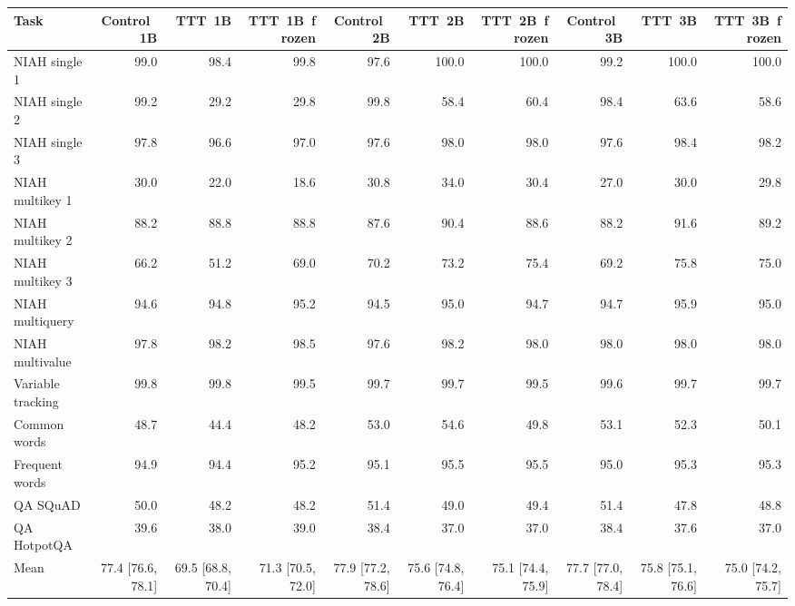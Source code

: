 \begin{tabular}{lrrrrrrrrr}
\toprule
Task & Control~1B & TTT~1B & TTT~1B~frozen & Control~2B & TTT~2B & TTT~2B~frozen & Control~3B & TTT~3B & TTT~3B~frozen \\
\midrule
NIAH single 1 & 99.0 & 98.4 & 99.8 & 97.6 & 100.0 & 100.0 & 99.2 & 100.0 & 100.0 \\
NIAH single 2 & 99.2 & 29.2 & 29.8 & 99.8 & 58.4 & 60.4 & 98.4 & 63.6 & 58.6 \\
NIAH single 3 & 97.8 & 96.6 & 97.0 & 97.6 & 98.0 & 98.0 & 97.6 & 98.4 & 98.2 \\
NIAH multikey 1 & 30.0 & 22.0 & 18.6 & 30.8 & 34.0 & 30.4 & 27.0 & 30.0 & 29.8 \\
NIAH multikey 2 & 88.2 & 88.8 & 88.8 & 87.6 & 90.4 & 88.6 & 88.2 & 91.6 & 89.2 \\
NIAH multikey 3 & 66.2 & 51.2 & 69.0 & 70.2 & 73.2 & 75.4 & 69.2 & 75.8 & 75.0 \\
NIAH multiquery & 94.6 & 94.8 & 95.2 & 94.5 & 95.0 & 94.7 & 94.7 & 95.9 & 95.0 \\
NIAH multivalue & 97.8 & 98.2 & 98.5 & 97.6 & 98.2 & 98.0 & 98.0 & 98.0 & 98.0 \\
Variable tracking & 99.8 & 99.8 & 99.5 & 99.7 & 99.7 & 99.5 & 99.6 & 99.7 & 99.7 \\
Common words & 48.7 & 44.4 & 48.2 & 53.0 & 54.6 & 49.8 & 53.1 & 52.3 & 50.1 \\
Frequent words & 94.9 & 94.4 & 95.2 & 95.1 & 95.5 & 95.5 & 95.0 & 95.3 & 95.3 \\
QA SQuAD & 50.0 & 48.2 & 48.2 & 51.4 & 49.0 & 49.4 & 51.4 & 47.8 & 48.8 \\
QA HotpotQA & 39.6 & 38.0 & 39.0 & 38.4 & 37.0 & 37.0 & 38.4 & 37.6 & 37.0 \\
\midrule
Mean & 77.4 [76.6, 78.1] & 69.5 [68.8, 70.4] & 71.3 [70.5, 72.0] & 77.9 [77.2, 78.6] & 75.6 [74.8, 76.4] & 75.1 [74.4, 75.9] & 77.7 [77.0, 78.4] & 75.8 [75.1, 76.6] & 75.0 [74.2, 75.7] \\
\bottomrule
\end{tabular}
